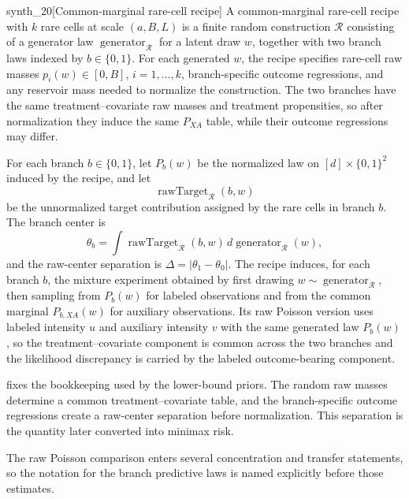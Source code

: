 \begin{definitionv}{synth_20}[Common-marginal rare-cell recipe]
A common-marginal rare-cell recipe with \(k\) rare cells at scale \((a,B,L)\) is a finite random construction \(\mathcal R\) consisting of a generator law \(\operatorname{generator}_{\mathcal R}\) for a latent draw \(w\), together with two branch laws indexed by \(b\in\{0,1\}\). For each generated \(w\), the recipe specifies rare-cell raw masses \(p_i(w)\in[0,B]\), \(i=1,\ldots,k\), branch-specific outcome regressions, and any reservoir mass needed to normalize the construction. The two branches have the same treatment--covariate raw masses and treatment propensities, so after normalization they induce the same \(P_{XA}\) table, while their outcome regressions may differ.

For each branch \(b\in\{0,1\}\), let \(P_b(w)\) be the normalized law on \([d]\times\{0,1\}^2\) induced by the recipe, and let
\[
\operatorname{rawTarget}_{\mathcal R}(b,w)
\]
be the unnormalized target contribution assigned by the rare cells in branch \(b\). The branch center is
\[
\theta_b=\int \operatorname{rawTarget}_{\mathcal R}(b,w)\,
d\operatorname{generator}_{\mathcal R}(w),
\]
and the raw-center separation is \(\Delta=|\theta_1-\theta_0|\). The recipe induces, for each branch \(b\), the mixture experiment obtained by first drawing
\(w\sim\operatorname{generator}_{\mathcal R}\), then sampling from \(P_b(w)\) for labeled observations and from the common marginal \(P_{b,XA}(w)\) for auxiliary observations. Its raw Poisson version uses labeled intensity \(u\) and auxiliary intensity \(v\) with the same generated law \(P_b(w)\), so the treatment--covariate component is common across the two branches and the likelihood discrepancy is carried by the labeled outcome-bearing component.
\end{definitionv}

 fixes the bookkeeping used by the lower-bound priors. The random raw masses determine a common treatment--covariate table, and the branch-specific outcome regressions create a raw-center separation before normalization. This separation is the quantity later converted into minimax risk.

The raw Poisson comparison enters several concentration and transfer statements, so the notation for the branch predictive laws is named explicitly before those estimates.


